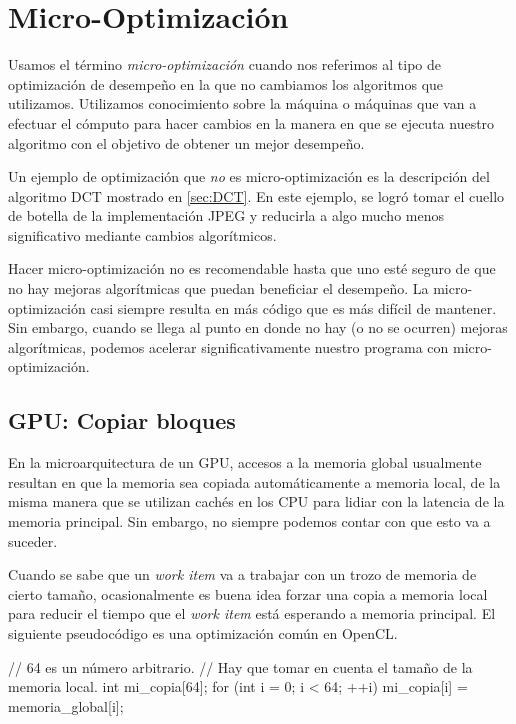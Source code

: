 {%
\section{Micro-Optimización} \label{sec:microopt}


Usamos el término \emph{micro-optimización} cuando nos referimos al tipo de
optimización de desempeño en la que no cambiamos los algoritmos que utilizamos.
Utilizamos conocimiento sobre la máquina o máquinas que van a
efectuar el cómputo para hacer cambios en la manera en que se ejecuta nuestro
algoritmo con el objetivo de obtener un mejor desempeño.

Un ejemplo de optimización que \emph{no} es micro-optimización es la
descripción del algoritmo DCT mostrado en \ref{sec:DCT}. En este ejemplo, se
logró tomar el cuello de botella de la implementación JPEG y reducirla a algo
mucho menos significativo mediante cambios algorítmicos.

Hacer micro-optimización no es recomendable hasta que uno esté seguro de que no
hay mejoras algorítmicas que puedan beneficiar el desempeño. La
micro-optimización casi siempre resulta en más código que es más difícil de
mantener. Sin embargo, cuando se llega al punto en donde no hay (o no se
ocurren) mejoras algorítmicas, podemos acelerar significativamente nuestro
programa con micro-optimización.

\subsection{GPU: Copiar bloques}

En la microarquitectura de un GPU, accesos a la memoria global usualmente
resultan en que la memoria sea copiada automáticamente a memoria local, de la
misma manera que se utilizan cachés en los CPU para lidiar con la latencia de la
memoria principal. Sin embargo, no siempre podemos contar con que esto va a
suceder.

Cuando se sabe que un \emph{work item} va a trabajar con un trozo de memoria de cierto
tamaño, ocasionalmente es buena idea forzar una copia a memoria local para
reducir el tiempo que el \emph{work item} está esperando a memoria principal. El
siguiente pseudocódigo es una optimización común en OpenCL.

\label{alg:gpgpu-memcpy}
\begin{code}[language=C][h]
    // 64 es un número arbitrario.
    // Hay que tomar en cuenta el tamaño de la memoria local.
    int mi_copia[64];
    for (int i = 0; i < 64; ++i) {
        mi_copia[i] = memoria_global[i];
    }
\end{code}

}
